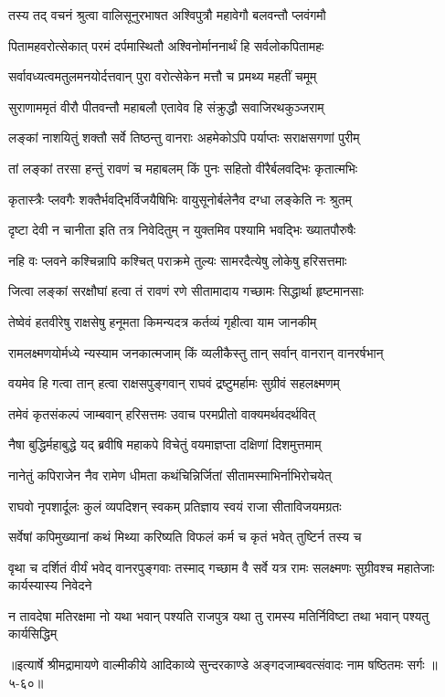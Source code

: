 
\twolineshloka
{तस्य तद् वचनं श्रुत्वा वालिसूनुरभाषत}
{अश्विपुत्रौ महावेगौ बलवन्तौ प्लवंगमौ} %

\twolineshloka
{पितामहवरोत्सेकात् परमं दर्पमास्थितौ}
{अश्विनोर्माननार्थं हि सर्वलोकपितामहः} %

\twolineshloka
{सर्वावध्यत्वमतुलमनयोर्दत्तवान् पुरा}
{वरोत्सेकेन मत्तौ च प्रमथ्य महतीं चमूम्} %

\twolineshloka
{सुराणाममृतं वीरौ पीतवन्तौ महाबलौ}
{एतावेव हि संक्रुद्धौ सवाजिरथकुञ्जराम्} %

\twolineshloka
{लङ्कां नाशयितुं शक्तौ सर्वे तिष्ठन्तु वानराः}
{अहमेकोऽपि पर्याप्तः सराक्षसगणां पुरीम्} %

\twolineshloka
{तां लङ्कां तरसा हन्तुं रावणं च महाबलम्}
{किं पुनः सहितो वीरैर्बलवद्भिः कृतात्मभिः} %

\twolineshloka
{कृतास्त्रैः प्लवगैः शक्तैर्भवद्भिर्विजयैषिभिः}
{वायुसूनोर्बलेनैव दग्धा लङ्केति नः श्रुतम्} %

\twolineshloka
{दृष्टा देवी न चानीता इति तत्र निवेदितुम्}
{न युक्तमिव पश्यामि भवद्भिः ख्यातपौरुषैः} %

\twolineshloka
{नहि वः प्लवने कश्चिन्नापि कश्चित् पराक्रमे}
{तुल्यः सामरदैत्येषु लोकेषु हरिसत्तमाः} %

\twolineshloka
{जित्वा लङ्कां सरक्षौघां हत्वा तं रावणं रणे}
{सीतामादाय गच्छामः सिद्धार्था हृष्टमानसाः} %

\twolineshloka
{तेष्वेवं हतवीरेषु राक्षसेषु हनूमता}
{किमन्यदत्र कर्तव्यं गृहीत्वा याम जानकीम्} %

\twolineshloka
{रामलक्ष्मणयोर्मध्ये न्यस्याम जनकात्मजाम्}
{किं व्यलीकैस्तु तान् सर्वान् वानरान् वानरर्षभान्} %

\twolineshloka
{वयमेव हि गत्वा तान् हत्वा राक्षसपुङ्गवान्}
{राघवं द्रष्टुमर्हामः सुग्रीवं सहलक्ष्मणम्} %

\twolineshloka
{तमेवं कृतसंकल्पं जाम्बवान् हरिसत्तमः}
{उवाच परमप्रीतो वाक्यमर्थवदर्थवित्} %

\twolineshloka
{नैषा बुद्धिर्महाबुद्धे यद् ब्रवीषि महाकपे}
{विचेतुं वयमाज्ञप्ता दक्षिणां दिशमुत्तमाम्} %

\twolineshloka
{नानेतुं कपिराजेन नैव रामेण धीमता}
{कथंचिन्निर्जितां सीतामस्माभिर्नाभिरोचयेत्} %

\twolineshloka
{राघवो नृपशार्दूलः कुलं व्यपदिशन् स्वकम्}
{प्रतिज्ञाय स्वयं राजा सीताविजयमग्रतः} %

\twolineshloka
{सर्वेषां कपिमुख्यानां कथं मिथ्या करिष्यति}
{विफलं कर्म च कृतं भवेत् तुष्टिर्न तस्य च} %

\threelineshloka
{वृथा च दर्शितं वीर्यं भवेद् वानरपुङ्गवाः}
{तस्माद् गच्छाम वै सर्वे यत्र रामः सलक्ष्मणः}
{सुग्रीवश्च महातेजाः कार्यस्यास्य निवेदने} %

\twolineshloka
{न तावदेषा मतिरक्षमा नो यथा भवान् पश्यति राजपुत्र}
{यथा तु रामस्य मतिर्निविष्टा तथा भवान् पश्यतु कार्यसिद्धिम्} %


॥इत्यार्षे श्रीमद्रामायणे वाल्मीकीये आदिकाव्ये सुन्दरकाण्डे अङ्गदजाम्बवत्संवादः नाम षष्ठितमः सर्गः ॥५-६०॥
